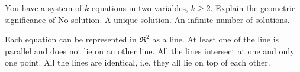 \index{}


\begin{Exercise}[
name={},
title={}, 
difficulty=0,
origin={\cite{KK}}]
You have a system of $k$ equations in two variables, $k\geq 2$.
Explain the geometric significance of
\Question No solution.
\Question A unique solution.
\Question An infinite number of solutions.
\end{Exercise}

\begin{Answer}
Each equation can be represented in $\Re^2$ as a line. 
\Question At least one of the line is parallel and does not lie on an other line.
\Question All the lines intersect at one and only one point.
\Question All the lines are identical, i.e. they all lie on top of each other.
\end{Answer}

